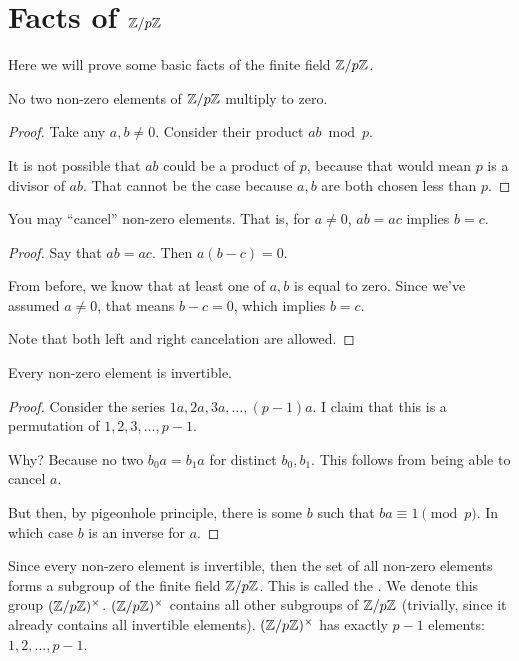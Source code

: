 \section{Facts of $\mathbb{Z} / p\mathbb{Z}$}

Here we will prove some basic facts of the finite field $\mathbb{Z} / p\mathbb{Z}$.

\begin{lemma}
  No two non-zero elements of $\mathbb{Z} / p\mathbb{Z}$ multiply to zero.
\end{lemma}

\begin{proof}
  Take any $a, b \ne 0$. Consider their product $ab \bmod p$.

  It is not possible that $ab$ could be a product of $p$, because that
  would mean $p$ is a divisor of $ab$. That cannot be the case because
  $a, b$ are both chosen less than $p$.
\end{proof}

\begin{lemma}
  You may ``cancel'' non-zero elements. That is, for $a \ne 0$, $ab =
  ac$ implies $b = c$.
\end{lemma}

\begin{proof}
  Say that $ab = ac$. Then $a (b - c) = 0$.

  From before, we know that at least one of $a, b$ is equal to zero.
  Since we've assumed $a \ne 0$, that means $b - c = 0$, which implies
  $b = c$.

  Note that both left and right cancelation are allowed.
\end{proof}

\begin{lemma}
  Every non-zero element is invertible.
\end{lemma}

\begin{proof}
  Consider the series $1a, 2a, 3a, \ldots, (p - 1)a$. I claim that this
  is a permutation of $1, 2, 3, \ldots, p - 1$.

  Why? Because no two $b_0 a = b_1 a$ for distinct $b_0, b_1$. This
  follows from being able to cancel $a$.

  But then, by pigeonhole principle, there is some $b$ such that $ba
  \equiv 1 \pmod{p}$. In which case $b$ is an inverse for $a$.
\end{proof}

\begin{definition}
  Since every non-zero element is invertible, then the set of all
  non-zero elements forms a subgroup of the finite field $\mathbb{Z} / p\mathbb{Z}$. This
  is called the . We denote this group
  $\mathopen{}\left( {\mathbb{Z} / p\mathbb{Z}} \right)\mathclose{}^\times$. $\mathopen{}\left( {\mathbb{Z} / p\mathbb{Z}} \right)\mathclose{}^\times$ contains all other subgroups of $\mathbb{Z} / p\mathbb{Z}$
  (trivially, since it already contains all invertible elements).
  $\mathopen{}\left( {\mathbb{Z} / p\mathbb{Z}} \right)\mathclose{}^\times$ has exactly $p - 1$ elements: $1, 2, ..., p - 1$.
\end{definition}

